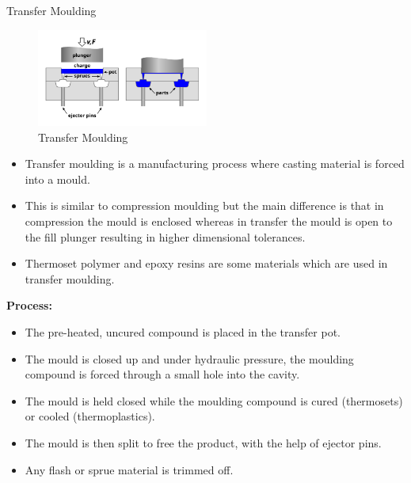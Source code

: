 \documentclass[11pt,t]{beamer}
\begin{document}
    \begin{frame}[allowframebreaks]{Transfer Moulding}
        \begin{figure}
            \vspace*{-10pt}
            \begin{center}
                \includegraphics[width=160pt]{transfer_molding}
            \end{center}
            \caption{Transfer Moulding}\label{fig:fig-4}
            \vspace*{-10pt}
        \end{figure}
        \begin{itemize}
            \item Transfer moulding is a manufacturing process where casting material is forced into a mould.
            \item This is similar to compression moulding but the main difference is that in compression the mould is
            enclosed whereas in transfer the mould is open to the fill plunger resulting in higher dimensional
            tolerances.
            \item Thermoset polymer and epoxy resins are some materials which are used in transfer moulding.
        \end{itemize}

        \framebreak

        \textbf{Process:}\\
        \begin{itemize}
            \item The pre-heated, uncured compound is placed in the transfer pot.
            \item The mould is closed up and under hydraulic pressure, the moulding compound is forced through a
            small hole into the cavity.
            \item The mould is held closed while the moulding compound is cured (thermosets) or cooled (thermoplastics).
            \item The mould is then split to free the product, with the help of ejector pins.
            \item Any flash or sprue material is trimmed off.
        \end{itemize}

    \end{frame}
\end{document}
